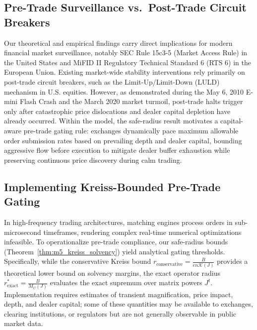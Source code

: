 \documentclass[12pt]{article}
\theoremstyle{definition}
\theoremstyle{remark}
\begin{document}
\subsection{Pre-Trade Surveillance vs.\ Post-Trade Circuit Breakers}
Our theoretical and empirical findings carry direct implications for modern financial market surveillance, notably SEC Rule 15c3-5 (Market Access Rule) in the United States and MiFID II Regulatory Technical Standard 6 (RTS 6) in the European Union. Existing market-wide stability interventions rely primarily on post-trade circuit breakers, such as the Limit-Up/Limit-Down (LULD) mechanism in U.S. equities. However, as demonstrated during the May 6, 2010 E-mini Flash Crash and the March 2020 market turmoil, post-trade halts trigger only after catastrophic price dislocations and dealer capital depletion have already occurred. Within the model, the safe-radius result motivates a capital-aware pre-trade gating rule: exchanges dynamically pace maximum allowable order submission rates based on prevailing depth and dealer capital, bounding aggressive flow before execution to mitigate dealer buffer exhaustion while preserving continuous price discovery during calm trading.

\subsection{Implementing Kreiss-Bounded Pre-Trade Gating}
In high-frequency trading architectures, matching engines process orders in sub-microsecond timeframes, rendering complex real-time numerical optimizations infeasible. To operationalize pre-trade compliance, our safe-radius bounds (Theorem~\ref{thm:m5_kreiss_solvency}) yield analytical gating thresholds. Specifically, while the conservative Kreiss bound $r_{\text{conservative}} = \frac{B}{e n \mathcal{K}(J)}$ provides a theoretical lower bound on solvency margins, the exact operator radius $r^*_{\text{exact}} = \frac{B}{M_C(J)}$ evaluates the exact supremum over matrix powers $J^t$. Implementation requires estimates of transient magnification, price impact, depth, and dealer capital; some of these quantities may be available to exchanges, clearing institutions, or regulators but are not generally observable in public market data.
\end{document}
